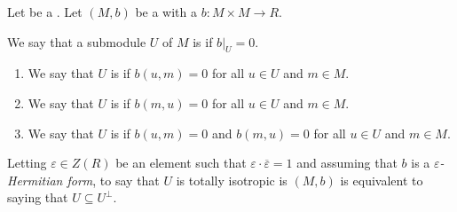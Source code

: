 \begin{definition} \label{definition:totally_isotropic_submodule_of_a_module_with_a_sesquilinear_form_over_a_ring_with_involution}
    Let  be a . Let $(M,b)$ be a  with a  $b: M \times M \to R$.

    We say that a submodule $U$ of $M$ is  if $b|_U = 0$. 
    \begin{enumerate}
        \item We say that $U$ is  if $b(u, m) = 0$ for all $u \in U$ and $m \in M$.
        \item We say that $U$ is  if $b(m, u) = 0$ for all $u \in U$ and $m \in M$.
        \item We say that $U$ is  if $b(u, m) = 0$ and $b(m,u) = 0$ for all $u \in U$ and $m \in M$.
    \end{enumerate}
    Letting $\varepsilon \in Z(R)$ be an element such that $\varepsilon \cdot \overline{\varepsilon} = 1$ and assuming that $b$ is a \textsl{$\varepsilon$-Hermitian form}, to say that $U$ is totally isotropic is $(M,b)$ is equivalent to saying that $U \subseteq U^\perp$.
\end{definition}